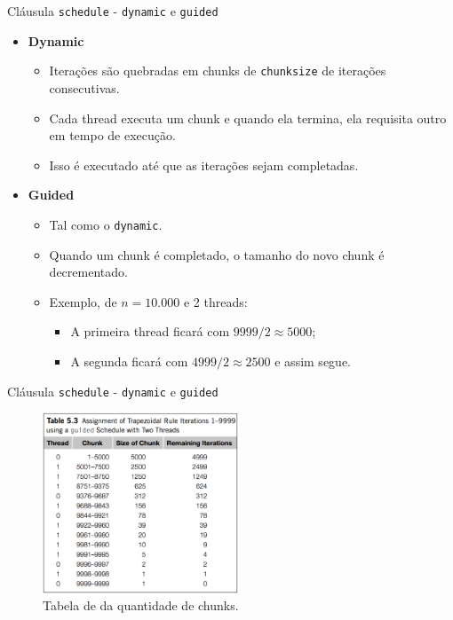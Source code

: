 	
	\begin{frame}{Cláusula {\tt schedule} - {\tt dynamic} e {\tt guided}}
		\begin{itemize}
			\setlength\itemsep{1.2em}
			\item \textbf{Dynamic}
			\begin{itemize}
				\setlength\itemsep{0.7em}
				\item Iterações são quebradas em chunks de {\tt chunksize} de iterações consecutivas.
				\item Cada thread executa um chunk e quando ela termina, ela requisita outro em tempo de execução.
				\item Isso é executado até que as iterações sejam completadas.
			\end{itemize}
			\item \textbf{Guided}
			\begin{itemize}
				\setlength\itemsep{0.5em}
				\item Tal como o {\tt dynamic}.
				\item Quando um chunk é completado, o tamanho do novo chunk é decrementado.
				\item Exemplo, de $n=10.000$ e 2 threads: 
				\begin{itemize}
					\item A primeira thread ficará com $9999/2 \approx 5000$;
					\item A segunda ficará com $4999/2 \approx 2500$ e assim segue.
				\end{itemize}
			\end{itemize}
		\end{itemize}
	\end{frame}

	\begin{frame}{Cláusula {\tt schedule} - {\tt dynamic} e {\tt guided}}
		\begin{figure}[p]
			\centering
			\includegraphics[width=0.52\textwidth]{img/pacheco/dynamic-guided.png}
			\caption{Tabela de da quantidade de chunks.}
		\end{figure}
	\end{frame}

